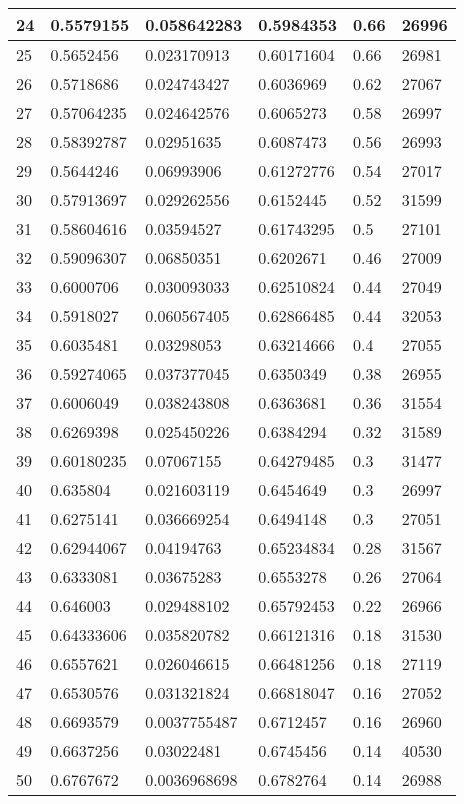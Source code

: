 \begin{longtable}{|l|l|l|l|l|l|}
24 & 0.5579155 & 0.058642283 & 0.5984353 & 0.66 & 26996 \\ \hline 
25 & 0.5652456 & 0.023170913 & 0.60171604 & 0.66 & 26981 \\ \hline 
26 & 0.5718686 & 0.024743427 & 0.6036969 & 0.62 & 27067 \\ \hline 
27 & 0.57064235 & 0.024642576 & 0.6065273 & 0.58 & 26997 \\ \hline 
28 & 0.58392787 & 0.02951635 & 0.6087473 & 0.56 & 26993 \\ \hline 
29 & 0.5644246 & 0.06993906 & 0.61272776 & 0.54 & 27017 \\ \hline 
30 & 0.57913697 & 0.029262556 & 0.6152445 & 0.52 & 31599 \\ \hline 
31 & 0.58604616 & 0.03594527 & 0.61743295 & 0.5 & 27101 \\ \hline 
32 & 0.59096307 & 0.06850351 & 0.6202671 & 0.46 & 27009 \\ \hline 
33 & 0.6000706 & 0.030093033 & 0.62510824 & 0.44 & 27049 \\ \hline 
34 & 0.5918027 & 0.060567405 & 0.62866485 & 0.44 & 32053 \\ \hline 
35 & 0.6035481 & 0.03298053 & 0.63214666 & 0.4 & 27055 \\ \hline 
36 & 0.59274065 & 0.037377045 & 0.6350349 & 0.38 & 26955 \\ \hline 
37 & 0.6006049 & 0.038243808 & 0.6363681 & 0.36 & 31554 \\ \hline 
38 & 0.6269398 & 0.025450226 & 0.6384294 & 0.32 & 31589 \\ \hline 
39 & 0.60180235 & 0.07067155 & 0.64279485 & 0.3 & 31477 \\ \hline 
40 & 0.635804 & 0.021603119 & 0.6454649 & 0.3 & 26997 \\ \hline 
41 & 0.6275141 & 0.036669254 & 0.6494148 & 0.3 & 27051 \\ \hline 
42 & 0.62944067 & 0.04194763 & 0.65234834 & 0.28 & 31567 \\ \hline 
43 & 0.6333081 & 0.03675283 & 0.6553278 & 0.26 & 27064 \\ \hline 
44 & 0.646003 & 0.029488102 & 0.65792453 & 0.22 & 26966 \\ \hline 
45 & 0.64333606 & 0.035820782 & 0.66121316 & 0.18 & 31530 \\ \hline 
46 & 0.6557621 & 0.026046615 & 0.66481256 & 0.18 & 27119 \\ \hline 
47 & 0.6530576 & 0.031321824 & 0.66818047 & 0.16 & 27052 \\ \hline 
48 & 0.6693579 & 0.0037755487 & 0.6712457 & 0.16 & 26960 \\ \hline 
49 & 0.6637256 & 0.03022481 & 0.6745456 & 0.14 & 40530 \\ \hline 
50 & 0.6767672 & 0.0036968698 & 0.6782764 & 0.14 & 26988 \\ \hline 
\end{longtable}